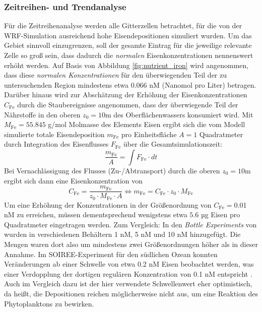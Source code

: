 \documentclass[12pt,a4paper,onecolumn]{scrartcl}
\begin{document}
\subsubsection{Zeitreihen- und Trendanalyse} \label{sec:timeseries}
Für die Zeitreihenanalyse werden alle Gitterzellen betrachtet, für die von der WRF-Simulation ausreichend hohe Eisendepositionen simuliert wurden. Um das Gebiet sinnvoll einzugrenzen, soll der gesamte Eintrag für die jeweilige relevante Zelle so groß sein, dass dadurch die \textit{normalen} Eisenkonzentrationen nennenswert erhöht werden. Auf Basis von Abbildung \ref{fig:nutrient_iron} wird angenommen, dass diese \textit{normalen Konzentrationen} für den überwiegenden Teil der zu untersuchenden Region mindestens etwa 0.066 nM (Nanomol pro Liter) betragen. Darüber hinaus wird zur Abschätzung der Erhöhung der Eisenkonzentrationen $C_\text{Fe}$ durch die Staubereignisse angenommen, dass der überwiegende Teil der Nährstoffe in den oberen $z_0 = 10$m des Oberflächenwassers konsumiert wird. Mit  $M_{\text{Fe}} =  55.845$ g/mol Molmasse des Elements Eisen ergibt sich die vom Modell simulierte totale Eisendeposition $m_\text{Fe}$ pro Einheitsfläche $A=1$ Quadratmeter durch Integration des Eisenflusses $F_\text{Fe}$ über die Gesamtsimulationszeit:
\begin{equation}
\frac{m_\text{Fe}}{A} = \int F_\text{Fe} \cdot dt
\end{equation}
Bei Vernachlässigung des Flusses (Zu-/Abtransport) durch die oberen $z_0=10$m ergibt sich dann eine Eisenkonzentration von
\begin{equation}
C_\text{Fe} = \frac{m_\text{Fe}}{z_0 \cdot M_{\text{Fe}} \cdot A} \Leftrightarrow m_\text{Fe} = C_\text{Fe} \cdot z_0 \cdot M_{\text{Fe}}
\end{equation}
Um eine Erhöhung der Konzentrationen in der Größenordnung von $C_\text{Fe}=$0.01 nM zu erreichen, müssen dementsprechend wenigstens etwa $5.6$ µg Eisen pro Quadratmeter eingetragen werden. Zum Vergleich: In den \textit{Bottle Experiments} von \citet{Martin.1988} wurden in verschiedenen Behältern 1 nM, 5 nM und 10 nM hinzugefügt. Die Mengen waren dort also um mindestens zwei Größenordnungen höher als in dieser Annahme. Im SOIREE-Experiment für den südlichen Ozean \citep{Trull.2001} konnten Veränderungen ab einer Schwelle von etwa 0.2 nM Eisen beobachtet werden, was einer Verdopplung der dortigen regulären Konzentration von 0.1 nM entspricht \citep{Boyd.2010}. Auch im Vergleich dazu ist der hier verwendete Schwellenwert eher optimistisch, da heißt, die Depositionen reichen möglicherweise nicht aus, um eine Reaktion des Phytoplanktons zu bewirken. \\
\end{document}
